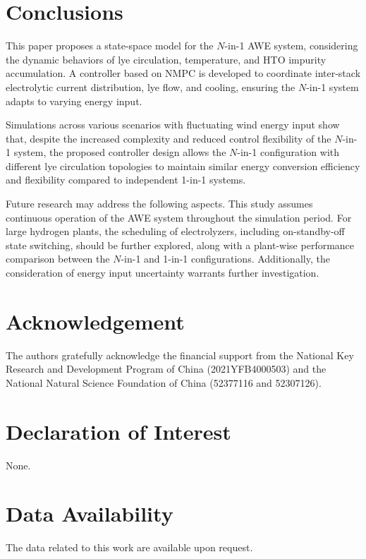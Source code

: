 \documentclass[review,3p,10pt]{elsarticle}
\begin{document}
\section{Conclusions}
\label{sec:conclusion}

This paper proposes a state-space model for the $N$-in-1 AWE system, considering the dynamic behaviors of lye circulation, temperature, and HTO impurity accumulation. A controller based on NMPC is developed to coordinate inter-stack electrolytic current distribution, lye flow, and cooling, ensuring the $N$-in-1 system adapts to varying energy input.

Simulations across various scenarios with fluctuating wind energy input show that, despite the increased complexity and reduced control flexibility of the $N$-in-1 system, the proposed controller design allows the $N$-in-1 configuration with different lye circulation topologies to maintain similar energy conversion efficiency and flexibility compared to independent 1-in-1 systems.

Future research may address the following aspects. This study assumes continuous operation of the AWE system throughout the simulation period. For large hydrogen plants, the scheduling of electrolyzers, including on-standby-off state switching, should be further explored, along with a plant-wise performance comparison between the $N$-in-1 and 1-in-1 configurations. Additionally, the consideration of energy input uncertainty warrants further investigation.

\section*{Acknowledgement}

The authors gratefully acknowledge the financial support from the National Key Research and Development Program of China (2021YFB4000503) and the National Natural Science Foundation of China (52377116 and 52307126).

\section*{Declaration of Interest}

None.

\section*{Data Availability}

The data related to this work are available upon request.
\end{document}
